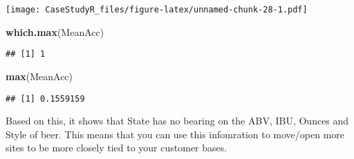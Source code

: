 \documentclass[
]{article}
\newenvironment{Shaded}{\begin{snugshade}}{\end{snugshade}}
\newcommand{\KeywordTok}[1]{\textcolor[rgb]{0.13,0.29,0.53}{\textbf{#1}}}
\newcommand{\NormalTok}[1]{#1}
\begin{document}
\texttt{[image: CaseStudyR\_files/figure-latex/unnamed-chunk-28-1.pdf]}

\begin{Shaded}
\begin{Highlighting}[]
\KeywordTok{which.max}\NormalTok{(MeanAcc)}
\end{Highlighting}
\end{Shaded}

\begin{verbatim}
## [1] 1
\end{verbatim}

\begin{Shaded}
\begin{Highlighting}[]
\KeywordTok{max}\NormalTok{(MeanAcc)}
\end{Highlighting}
\end{Shaded}

\begin{verbatim}
## [1] 0.1559159
\end{verbatim}

Based on this, it shows that State has no bearing on the ABV, IBU,
Ounces and Style of beer. This means that you can use this infomration
to move/open more sites to be more closely tied to your customer bases.
\end{document}
